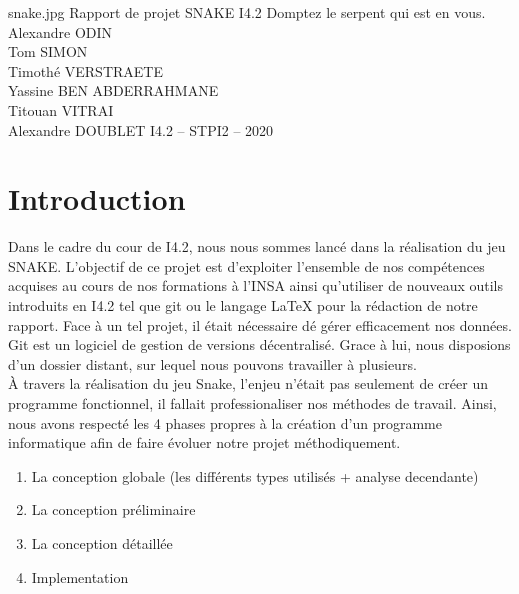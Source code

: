 \documentclass[11pt,a4paper]{article}
\begin{document}
\PageDeGarde	
{snake.jpg} %
{Rapport de projet SNAKE I4.2} %
{Domptez le serpent qui est en vous.} %
{Alexandre \textsc{ODIN}\\
Tom \textsc{SIMON}\\
Timothé \textsc{VERSTRAETE}\\
Yassine \textsc{BEN ABDERRAHMANE }\\
Titouan \textsc{VITRAI}\\
Alexandre \textsc{DOUBLET}\vspace{5cm}}
{I4.2 – STPI2 – 2020} %



\tableofcontents

\clearpage %
\section*{Introduction} %

   
   
   Dans le cadre du cour de I4.2, nous nous sommes lancé dans la réalisation du jeu SNAKE.  L'objectif de ce projet est d'exploiter l'ensemble de nos compétences acquises au cours de nos formations à l'INSA ainsi qu'utiliser de nouveaux outils introduits en I4.2 tel que git ou le langage \LaTeX{}  pour la rédaction de notre rapport. Face à un tel projet, il était nécessaire dé gérer efficacement nos données. Git est un logiciel de gestion de versions décentralisé. Grace à lui, nous disposions d’un dossier distant, sur lequel nous pouvons travailler à plusieurs.\\
   
   À travers la réalisation du jeu Snake, l'enjeu n'était pas seulement de créer un programme fonctionnel, il fallait professionaliser nos méthodes de travail. Ainsi, nous avons respecté les 4 phases propres à la création d'un programme informatique afin de faire évoluer notre projet méthodiquement.
   
   \begin{enumerate}
    \item La conception globale (les différents types utilisés + analyse decendante)
    \item La conception préliminaire
    \item La conception détaillée
    \item Implementation
    \end{enumerate}
   
\end{document}
